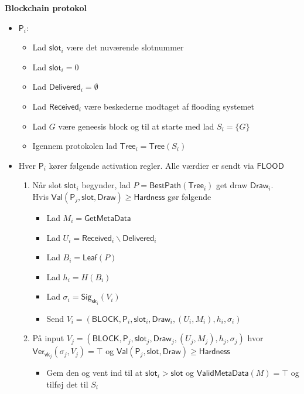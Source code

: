 \documentclass[a4, english]{article}
\begin{document}
\begin{framed}  
\begin{center}  
  \textbf{Blockchain protokol} 
\end{center}
\begin{itemize}
	\item $\mathsf{P}_i:$ 
  \begin{itemize}
  	\item Lad $\mathsf{slot}_i$ være det nuværende slotnummer 
    \item Lad $\mathsf{slot}_i=0$ 
    \item Lad $\mathsf{Delivered}_i = \emptyset$  
    \item Lad $\mathsf{Received}_i$ være beskederne modtaget af flooding systemet 
    \item Lad $G$ være geneesis block og til at starte med lad $S_i = \{G\}$  
    \item Igennem protokolen lad $\mathsf{Tree}_i = \mathsf{Tree}(S_i)$ 
  \end{itemize}
  \item Hver $\mathsf{P}_i$ kører følgende activation regler. Alle værdier er sendt via $\mathsf{FLOOD}$  
  \begin{enumerate}
  	\item Når slot $\mathsf{slot}_i$ begynder, lad $P = \mathsf{BestPath}(\mathsf{Tree}_i)$ get draw $\mathsf{Draw}_i$.\\ Hvis $\mathsf{Val}(\mathsf{P}_j,\mathsf{slot}, \mathsf{Draw}) \geq \mathsf{Hardness}$ gør følgende
    \begin{itemize}
    	\item Lad $M_i = \mathsf{GetMetaData}$ 
      \item Lad $U_i = \mathsf{Received}_i \backslash \mathsf{Delivered}_i$ 
      \item Lad $B_i = \mathsf{Leaf}(P)$ 
      \item Lad $h_i = H(B_i)$ 
      \item Lad $\sigma_i = \mathsf{Sig}_{\mathsf{sk}_i}(V_i)$ 
      \item Send $V_i = (\mathsf{BLOCK}, \mathsf{P}_i, \mathsf{slot}_i, \mathsf{Draw}_i, (U_i,M_i), h_i, \sigma_i)$
    \end{itemize}
    \item På input $V_j = (\mathsf{BLOCK}, \mathsf{P}_j, \mathsf{slot}_j, \mathsf{Draw}_j, (U_j,M_j), h_j, \sigma_j)$ hvor $\mathsf{Ver}_{\mathsf{vk}_j}(\sigma_j,V_j) = \top$ og $\mathsf{Val}(\mathsf{P}_j,\mathsf{slot}, \mathsf{Draw}) \geq \mathsf{Hardness}$
    \begin{itemize}
    	\item Gem den og vent ind til at $\mathsf{slot}_i>\mathsf{slot}$ og $\mathsf{ValidMetaData}(M) = \top$ og tilføj det til $S_i$ 
    \end{itemize} 
  \end{enumerate}
\end{itemize}
\end{framed}
\end{document}
